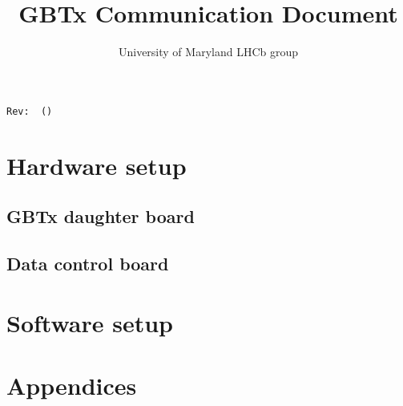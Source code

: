 \documentclass[11pt,letterpaper]{refart}
\title{GBTx Communication Document}
\author{University of Maryland LHCb group}
\begin{document}
\maketitle
\hfill\small{\texttt{Rev:~\gitRel~(\gitAbbrevHash)}}
\tableofcontents
\listoffigures
\clearpage

\section{Hardware setup}
\subsection{GBTx daughter board}







\subsection{Data control board}





\section{Software setup}






\newpage \appendix
\section*{Appendices}
\renewcommand{\thesubsection}{\Alph{subsection}}




\end{document}

